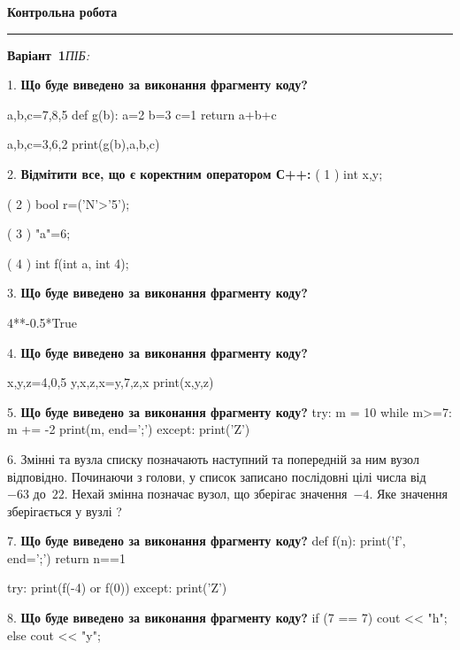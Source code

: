 \documentclass[11pt]{article}
\begin{document}
{\centering\Large\bfseries Контрольна робота\par}
\medskip
\noindent\rule{\linewidth}{0.5pt}
\smallskip
\noindent\textbf{Варіант \No\,1}\hfill \textit{ПІБ:}\,\underline{\hspace{60mm}}
\vspace{4mm}

1. \textbf{Що буде виведено за виконання фрагменту коду?}

a,b,c=7,8,5
def g(b):
    a=2
    b=3
    c=1
    return a+b+c

a,b,c=3,6,2
print(g(b),a,b,c)
\par\vspace{5mm}
2. %
\textbf{Відмітити все, що є коректним оператором С++:}
( 1 ) int x,y;

( 2 ) bool r=('N'>'5');

( 3 ) "a"=6;

( 4 ) int f(int a, int 4);
\par\vspace{5mm}
3. \textbf{Що буде виведено за виконання фрагменту коду?}

4**-0.5*True
\par\vspace{5mm}
4. \textbf{Що буде виведено за виконання фрагменту коду?}

x,y,z=4,0,5
y,x,z,x=y,7,z,x
print(x,y,z)
\par\vspace{5mm}
5. \textbf{Що буде виведено за виконання фрагменту коду?}
try:
    m = 10
    while m>=7:
        m += -2
    print(m, end=';')
except:
    print('Z')
\par\vspace{5mm}
6. 
Змінні  та  вузла списку позначають наступний та попередній за ним вузол відповідно. Починаючи з голови, у список записано послідовні цілі числа від~$-63$ до~$22$. Нехай змінна  позначає вузол, що зберігає значення~$-4$.
Яке значення зберігається у вузлі  ?
\par\vspace{5mm}
7. \textbf{Що буде виведено за виконання фрагменту коду?}
def f(n):
    print('f', end=';')
    return n==1

try:
    print(f(-4) or f(0))
except:
    print('Z')
\par\vspace{5mm}
8. \textbf{Що буде виведено за виконання фрагменту коду?}
if (7 == 7)
    cout << "h";
else
    cout << "y";
\end{document}

